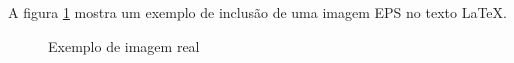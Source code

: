 A figura \ref{Fig:belmonte} mostra um exemplo de inclusão de uma
imagem EPS no texto \LaTeX.

\begin{figure}[htbp!]
\begin{center}
\caption{Exemplo de imagem real}
\label{Fig:belmonte}
\end{center} 
\end{figure}



